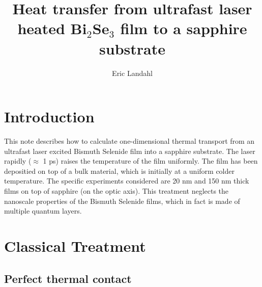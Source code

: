 \documentclass[letterpaper,11pt]{article}
\begin{document}
\title{Heat transfer from ultrafast laser heated Bi$_2$Se$_3$ film to a sapphire substrate}
\author{Eric Landahl}

\maketitle

\section{Introduction}
This note describes how to calculate one-dimensional thermal transport from an ultrafast laser excited Bismuth Selenide film into a sapphire substrate.  The laser rapidly  ($\approx$ 1 ps) raises the temperature of the film uniformly.  The film has been depositied on top of a bulk material, which is initially at a uniform colder temperature.   The specific experiments considered are 20 nm and 150 nm thick films on top of sapphire (on the optic axis).  This treatment neglects the nanoscale properties of the Bismuth Selenide films, which in fact is made of multiple quantum layers.  

\section{Classical Treatment}

\subsection{Perfect thermal contact}
\end{document}
